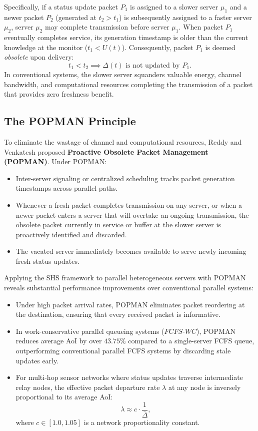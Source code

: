 Specifically, if a status update packet $P_1$ is assigned to a slower server $\mu_1$ and a newer packet $P_2$ (generated at $t_2 > t_1$) is subsequently assigned to a faster server $\mu_2$, server $\mu_2$ may complete transmission before server $\mu_1$. When packet $P_1$ eventually completes service, its generation timestamp is older than the current knowledge at the monitor ($t_1 < U(t)$). Consequently, packet $P_1$ is deemed \emph{obsolete} upon delivery:
\begin{equation}
    t_1 < t_2 \implies \Delta(t) \text{ is not updated by } P_1.
\end{equation}
In conventional systems, the slower server squanders valuable energy, channel bandwidth, and computational resources completing the transmission of a packet that provides zero freshness benefit.

\subsection{The POPMAN Principle}
To eliminate the wastage of channel and computational resources, Reddy and Venkatesh proposed \textbf{Proactive Obsolete Packet Management (POPMAN)}. Under POPMAN:
\begin{itemize}
    \item Inter-server signaling or centralized scheduling tracks packet generation timestamps across parallel paths.
    \item Whenever a fresh packet completes transmission on any server, or when a newer packet enters a server that will overtake an ongoing transmission, the obsolete packet currently in service or buffer at the slower server is proactively identified and discarded.
    \item The vacated server immediately becomes available to serve newly incoming fresh status updates.
\end{itemize}

Applying the SHS framework to parallel heterogeneous servers with POPMAN reveals substantial performance improvements over conventional parallel systems:
\begin{itemize}
    \item Under high packet arrival rates, POPMAN eliminates packet reordering at the destination, ensuring that every received packet is informative.
    \item In work-conservative parallel queueing systems ($FCFS\text{-}WC$), POPMAN reduces average AoI by over $43.75\%$ compared to a single-server FCFS queue, outperforming conventional parallel FCFS systems by discarding stale updates early.
    \item For multi-hop sensor networks where status updates traverse intermediate relay nodes, the effective packet departure rate $\lambda$ at any node is inversely proportional to its average AoI:
    \begin{equation}
        \lambda \approx c \cdot \frac{1}{\bar{\Delta}},
    \end{equation}
    where $c \in [1.0, 1.05]$ is a network proportionality constant.
\end{itemize}

